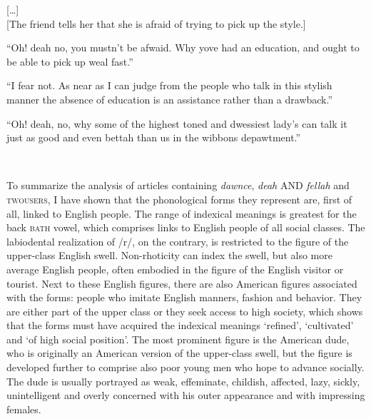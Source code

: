 \begin{ipquote}
{\centering
{[…]}\\
{[The friend tells her that she is afraid of trying to pick up the style.]}

“Oh! deah no, you mustn’t be afwaid. Why yove had an education, and ought to be able to pick up weal fast.”}

{“I fear not. As near as I can judge from the people who talk in this stylish manner the absence of education is an assistance rather than a drawback.”

“Oh! deah, no, why some of the highest toned and dwessiest lady’s can talk it just as good and even bettah than us in the wibbons depawtment.”

\centering {[...]}\\}
\end{ipquote}

To summarize the analysis of articles containing \emph{dawnce}, \emph{deah} AND \emph{fellah} and \textsc{twousers}, I have shown that the phonological forms they represent are, first of all, linked to English people. The range of indexical meanings is greatest for the back \textsc{bath} vowel, which comprises links to English people of all social classes. The labiodental realization of /r/, on the contrary, is restricted to the figure of the upper-class English swell. Non-rhoticity can index the swell, but also more average English people, often embodied in the figure of the English visitor or tourist. Next to these English figures, there are also American figures associated with the forms: people who imitate English manners, fashion and behavior. They are either part of the upper class or they seek access to high society, which shows that the forms must have acquired the indexical meanings ‘refined’, ‘cultivated’ and ‘of high social position’. The most prominent figure is the American dude, who is originally an American version of the upper-class swell, but the figure is developed further to comprise also poor young men who hope to advance socially. The dude is usually portrayed as weak, effeminate, childish, affected, lazy, sickly, unintelligent and overly concerned with his outer appearance and with impressing females.

